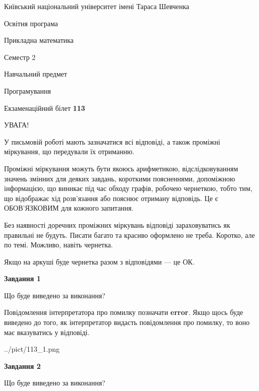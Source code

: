 \documentclass[12pt, ukrainian]{article}
\begin{document}
{{\begin {small}\par
{ \center  Київський національний університет імені Тараса Шевченка \par}
{\parbox {5 cm}{Освітня програма \hfill}{\parbox {7 cm}{Прикладна математика \hfill}}\parbox {6 cm}{\hfill Семестр 2}}\par
{\parbox {5 cm} {Навчальний предмет \hfill}\parbox {7 cm}{Програмування \hfill}\parbox {6cm}{\hfill}\par}\vspace{-7pt} \end{small}}{\center Екзаменаційний білет \No \textbf
{ 113 }\par}}
{
\begin {large}
УВАГА!

У письмовій роботі мають зазначатися всі відповіді, а також проміжні міркування, що передували їх отриманню.

Проміжні міркування можуть бути якоюсь арифметикою, відслідковуванням зна\-чень змінних для деяких завдань,
короткими поясненнями, допоміжною інформацією, що виникає під час обходу графів, робочею чернеткою,
тобто тим, що відображає хід розв’язання або пояснює отриману відповідь.
Це є ОБОВ’ЯЗКОВИМ для кожного запитання.

Без наявності доречних проміжних міркувань відповіді зараховуватись як правиль\-ні не будуть.
Писати багато та красиво оформлено не треба. Коротко, але по темі. Можли\-во, навіть чернетка.

Якщо на аркуші буде чернетка разом з відповідями --- це ОК.

\newpage

{\begin {center}\textbf{Завдання 1}\end {center}}\par
Що буде виведено за виконання?

Повідомлення інтерпретатора про помилку позначати \textbf{error}.
Якщо щось буде виведено до того, як інтерпретатор видасть повідомлення про помилку, 
то воно має вказуватись у відповіді. \par


\begin{center}
	{../pict/113_1.png}
\end{center}
\newpage

{\begin {center}\textbf{Завдання 2}\end {center}}\par
Що буде виведено за виконання?


\end{large}}
\end{document}
